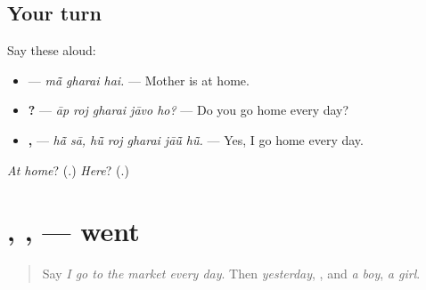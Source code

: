 \subsection*{Your turn}
Say these aloud:

\begin{itemize}
\raggedright
  \item \textbf{  } — \emph{mā̃ gharai hai.} — Mother is at home.
  \item \textbf{    ?} — \emph{āp roj gharai jāvo ho?} — Do you go home every day?
  \item \textbf{ ,     } — \emph{hā̃ sā, hū̃ roj gharai jāū̃ hū̃.} — Yes, I go home every day.
\end{itemize}

\begin{tcolorbox}[breakable,colback=teal!4,colframe=teal!35!black,title={Before you move on}]
\emph{At home}? (\textbf{}.) \emph{Here}? (\textbf{}.)
\end{tcolorbox}
\section[\texorpdfstring{\mw{गयो} · \mw{गई} · \mw{गया} (gayo · gaī · gayā)}{गयो · गई · गया (gayo · gaī · gayā)}]{, ,  — went}

\label{lesson:MW-C159-gayo}



\begin{quote}
Say \emph{I go to the market every day}. Then \emph{yesterday}, \textbf{}, and \emph{a boy}, \emph{a girl}.
\end{quote}

